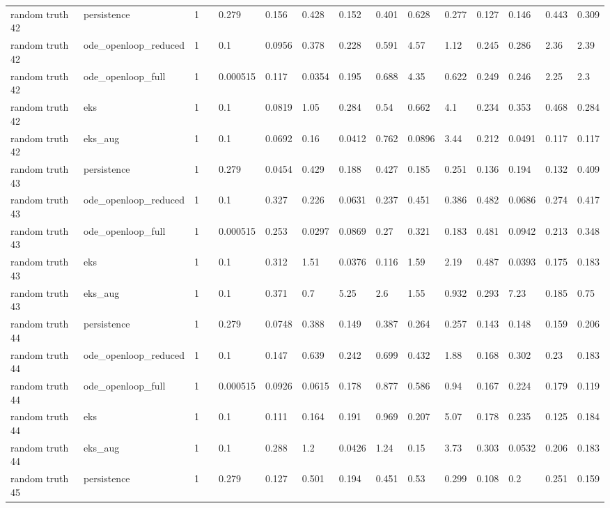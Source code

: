\begin{table}[t]
\begin{tabular}{lllllllllllllll}
random truth 42 & persistence & 1 &  & 0.279 & 0.156 & 0.428 & 0.152 & 0.401 & 0.628 & 0.277 & 0.127 & 0.146 & 0.443 & 0.309 \\
random truth 42 & ode\_openloop\_reduced & 1 &  & 0.1 & 0.0956 & 0.378 & 0.228 & 0.591 & 4.57 & 1.12 & 0.245 & 0.286 & 2.36 & 2.39 \\
random truth 42 & ode\_openloop\_full & 1 &  & 0.000515 & 0.117 & 0.0354 & 0.195 & 0.688 & 4.35 & 0.622 & 0.249 & 0.246 & 2.25 & 2.3 \\
random truth 42 & eks & 1 &  & 0.1 & 0.0819 & 1.05 & 0.284 & 0.54 & 0.662 & 4.1 & 0.234 & 0.353 & 0.468 & 0.284 \\
random truth 42 & eks\_aug & 1 &  & 0.1 & 0.0692 & 0.16 & 0.0412 & 0.762 & 0.0896 & 3.44 & 0.212 & 0.0491 & 0.117 & 0.117 \\
random truth 43 & persistence & 1 &  & 0.279 & 0.0454 & 0.429 & 0.188 & 0.427 & 0.185 & 0.251 & 0.136 & 0.194 & 0.132 & 0.409 \\
random truth 43 & ode\_openloop\_reduced & 1 &  & 0.1 & 0.327 & 0.226 & 0.0631 & 0.237 & 0.451 & 0.386 & 0.482 & 0.0686 & 0.274 & 0.417 \\
random truth 43 & ode\_openloop\_full & 1 &  & 0.000515 & 0.253 & 0.0297 & 0.0869 & 0.27 & 0.321 & 0.183 & 0.481 & 0.0942 & 0.213 & 0.348 \\
random truth 43 & eks & 1 &  & 0.1 & 0.312 & 1.51 & 0.0376 & 0.116 & 1.59 & 2.19 & 0.487 & 0.0393 & 0.175 & 0.183 \\
random truth 43 & eks\_aug & 1 &  & 0.1 & 0.371 & 0.7 & 5.25 & 2.6 & 1.55 & 0.932 & 0.293 & 7.23 & 0.185 & 0.75 \\
random truth 44 & persistence & 1 &  & 0.279 & 0.0748 & 0.388 & 0.149 & 0.387 & 0.264 & 0.257 & 0.143 & 0.148 & 0.159 & 0.206 \\
random truth 44 & ode\_openloop\_reduced & 1 &  & 0.1 & 0.147 & 0.639 & 0.242 & 0.699 & 0.432 & 1.88 & 0.168 & 0.302 & 0.23 & 0.183 \\
random truth 44 & ode\_openloop\_full & 1 &  & 0.000515 & 0.0926 & 0.0615 & 0.178 & 0.877 & 0.586 & 0.94 & 0.167 & 0.224 & 0.179 & 0.119 \\
random truth 44 & eks & 1 &  & 0.1 & 0.111 & 0.164 & 0.191 & 0.969 & 0.207 & 5.07 & 0.178 & 0.235 & 0.125 & 0.184 \\
random truth 44 & eks\_aug & 1 &  & 0.1 & 0.288 & 1.2 & 0.0426 & 1.24 & 0.15 & 3.73 & 0.303 & 0.0532 & 0.206 & 0.183 \\
random truth 45 & persistence & 1 &  & 0.279 & 0.127 & 0.501 & 0.194 & 0.451 & 0.53 & 0.299 & 0.108 & 0.2 & 0.251 & 0.159 \\

\end{tabular}
\end{table}
